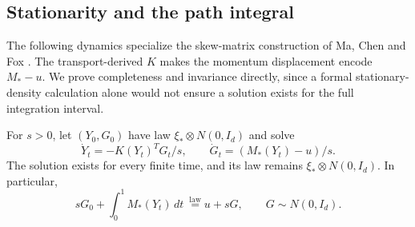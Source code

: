 \subsection{Stationarity and the path integral}

The following dynamics specialize the skew-matrix construction of
Ma, Chen and Fox
\citep[Section~2.1, Equation~(3), Theorem~1]{ma2015recipe}.
The transport-derived $K$ makes the momentum displacement encode
$M_*-u$.  We prove completeness and invariance directly, since a
formal stationary-density calculation alone would not ensure a
solution exists for the full integration interval.

\begin{proposition}
\label{prop:centering-law}
For $s>0$, let $(Y_0,G_0)$ have law $\xi_*\otimes N(0,I_d)$ and solve
\begin{equation}\label{eq:centering-flow}
 \dot Y_t=-K(Y_t)^TG_t/s,\qquad
 \dot G_t=(M_*(Y_t)-u)/s.
\end{equation}
The solution exists for every finite time, and its law remains
$\xi_*\otimes N(0,I_d)$.  In particular,
\begin{equation}\label{eq:centering-output}
 sG_0+\int_0^1M_*(Y_t)\,dt\ \stackrel{\mathrm{law}}=
 u+sG,\qquad G\sim N(0,I_d).
\end{equation}
\end{proposition}

